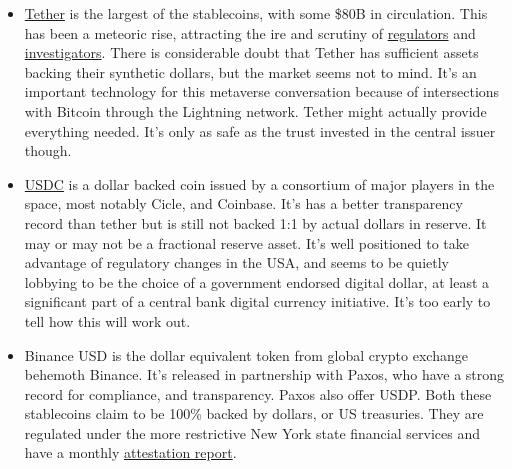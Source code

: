 \begin{itemize}
\item \href{https://tether.to/en/whitepaper/}{Tether} is the largest of the stablecoins, with some \$80B in circulation. This has been a meteoric rise, attracting the ire and scrutiny of \href{https://www.cftc.gov/PressRoom/PressReleases/8450-21}{regulators} and \href{https://www.bloomberg.com/news/features/2021-10-07/crypto-mystery-where-s-the-69-billion-backing-the-stablecoin-tether}{investigators}. There is considerable doubt that Tether has sufficient assets backing their synthetic dollars, but the market seems not to mind. It's an important technology for this metaverse conversation because of intersections with Bitcoin through the Lightning network. Tether might actually provide everything needed. It's only as safe as the trust invested in the central issuer though.
\item \href{https://f.hubspotusercontent30.net/hubfs/9304636/PDF/centre-whitepaper.pdf}{USDC} is a dollar backed coin issued by a consortium of major players in the space, most notably Cicle, and Coinbase. It's has a better transparency record than tether but is still not backed 1:1 by actual dollars in reserve. It may or may not be a fractional reserve asset. It's  well positioned to take advantage of regulatory changes in the USA, and seems to be quietly lobbying to be the choice of a government endorsed digital dollar, at least a significant part of a central bank digital currency initiative. It's too early to tell how this will work out.
\item Binance USD is the dollar equivalent token from global crypto exchange behemoth Binance. It's released in partnership with Paxos, who have a strong record for compliance, and transparency. Paxos also offer USDP. Both these stablecoins claim to be 100\% backed by dollars, or US treasuries. They are regulated under the more restrictive New York state financial services and have a monthly \href{https://paxos.com/attestations/}{attestation report}.

\end{itemize}
